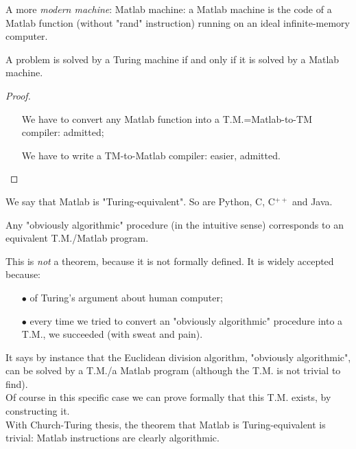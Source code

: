 A more \emph{modern machine}: Matlab machine: a Matlab machine is the code of a Matlab function (without "rand" instruction) running on an ideal infinite-memory computer.\\

\begin{theorem}
A problem is solved by a Turing machine if and only if it is solved by a Matlab machine.
\end{theorem}
\begin{proof}
\hfill
\begin{itemize}
\item[{\color{cyan}\fbox{$\Leftarrow$}}]  We have to convert any Matlab function into a T.M.=Matlab-to-TM compiler: admitted;
\item[{\color{cyan}\fbox{$\Rightarrow$}}] We have to write a TM-to-Matlab compiler: easier, admitted.
\end{itemize}
\end{proof}

We say that Matlab is "Turing-equivalent". So are Python, C, C$^{++}$ and Java.\\

\begin{thesis}
Any "obviously algorithmic" procedure (in the intuitive sense) corresponds to an equivalent T.M./Matlab program.
\end{thesis}
This is \emph{not} a theorem, because it is not formally defined. It is widely accepted because: 
\begin{itemize}
\item[$\bullet$] of Turing's argument about human computer;
\item[$\bullet$] every time we tried to convert an "obviously algorithmic" procedure into a T.M., we succeeded (with sweat and pain).\\
\end{itemize} 

It says by instance that the Euclidean division algorithm, "obviously algorithmic", can be solved by a T.M./a Matlab program (although the T.M. is not trivial to find).\\
Of course in this specific case we can prove formally that this T.M. exists, by constructing it.\\

With Church-Turing thesis, the theorem that Matlab is Turing-equivalent is trivial: Matlab instructions are clearly algorithmic.\\

